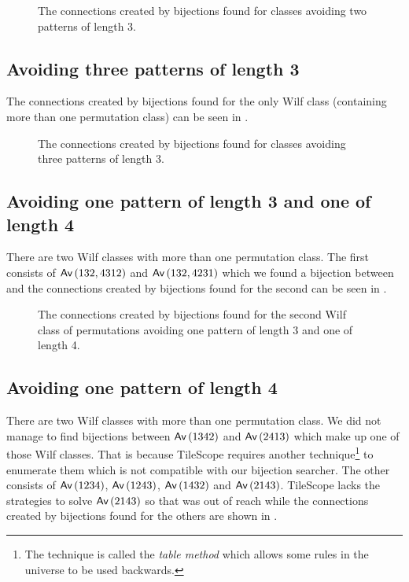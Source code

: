 \begin{figure}[ht!]
    \centering
    
    \caption{The connections created by bijections found for classes avoiding two patterns of length $3$.}
    \label{fig:2x3bi}
\end{figure}

\subsection{Avoiding three patterns of length 3}
The connections created by bijections found for the only Wilf class (containing more than one permutation class) can be seen in . 
\begin{figure}[ht!]
    \centering
    
    \caption{The connections created by bijections found for classes avoiding three patterns of length $3$.}
    \label{fig:3x3bi}
\end{figure}


\subsection{Avoiding one pattern of length 3 and one of length 4}
There are two Wilf classes with more than one permutation class. The first consists of $\textsf{Av}\left(132,4312\right)$ and $\textsf{Av}\left(132,4231\right)$ which we found a bijection between and the connections created by bijections found for the second can be seen in .

%    

\begin{figure}[ht!]
    \centering
    
    \caption{The connections created by bijections found for the second Wilf class of permutations avoiding one pattern of length 3 and one of length 4.}
    \label{fig:1x31x4bi_2}
\end{figure}

\subsection{Avoiding one pattern of length 4}
There are two Wilf classes with more than one permutation class. We did not manage to find bijections between $\textsf{Av}\left(1342\right)$ and $\textsf{Av}\left(2413\right)$ which make up one of those Wilf classes. That is because TileScope requires another technique\footnote{The technique is called the \emph{table method} which allows some rules in the universe to be used backwards.} to enumerate them which is not compatible with our bijection searcher. The other consists of $\textsf{Av}\left(1234\right)$, $\textsf{Av}\left(1243\right)$, $\textsf{Av}\left(1432\right)$ and $\textsf{Av}\left(2143\right)$. TileScope lacks the strategies to solve $\textsf{Av}\left(2143\right)$ so that was out of reach while the connections created by bijections found for the others are shown in .

